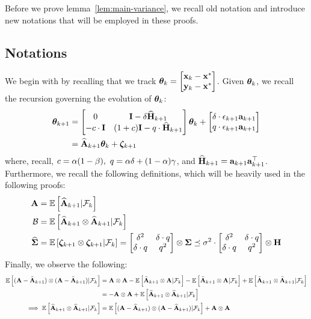 Before we prove lemma~\ref{lem:main-variance}, we recall old notation and introduce new notations that will be employed in these proofs.
\subsection{Notations}
We begin with by recalling that we track $\boldsymbol{\theta}_k=\begin{bmatrix}\mathbf{x}_k-\mathbf{x}^*\\\mathbf{y}_k-\mathbf{x}^*\end{bmatrix}$. Given $\boldsymbol{\theta}_k$, we recall the recursion governing the evolution of $\boldsymbol{\theta}_k$:
\begin{align}
\label{eq:simpleXYRec}
\boldsymbol{\theta}_{k+1}&=\begin{bmatrix}0&\mathbf{I}-\delta\widehat{\mathbf{H}}_{k+1}\\-c\cdot\mathbf{I}&(1+c)\mathbf{I}-q\cdot\widehat{\mathbf{H}}_{k+1}\end{bmatrix}\boldsymbol{\theta}_k+\begin{bmatrix}\delta\cdot\epsilon_{k+1}\mathbf{a}_{k+1}\\q\cdot\epsilon_{k+1}\mathbf{a}_{k+1}\end{bmatrix}\nonumber\\
&=\widehat{\mathbf{A}}_{k+1}\boldsymbol{\theta}_{k}+\boldsymbol{\zeta}_{k+1}
\end{align}
where, recall, $c=\alpha(1-\beta),\  q=\alpha\delta+(1-\alpha)\gamma$, and $\widehat{\mathbf{H}}_{k+1}=\mathbf{a}_{k+1}\mathbf{a}_{k+1}^{\top}$. Furthermore, we recall the following definitions, which will be heavily used in the following proofs:
\begin{align*}
\mathbf{A}&=\mathbb{E}\left[\widehat{\mathbf{A}}_{k+1}|\mathcal{F}_{k}\right]\\
\mathcal{B}&=\mathbb{E}\left[\widehat{\mathbf{A}}_{k+1}\otimes\widehat{\mathbf{A}}_{k+1}|\mathcal{F}_{k}\right]\\
\mathbf{\widehat{\Sigma}}&=\mathbb{E}\left[\boldsymbol{\zeta}_{k+1}\otimes\boldsymbol{\zeta}_{k+1}|\mathcal{F}_{k}\right]=\begin{bmatrix}\delta^2&\delta\cdot q\\\delta\cdot q&q^2\end{bmatrix}\otimes\mathbf{\Sigma}\preceq\sigma^2\cdot\begin{bmatrix}\delta^2&\delta\cdot q\\\delta\cdot q&q^2\end{bmatrix}\otimes\mathbf{H}
\end{align*}
\iffalse
Finally, we observe the following:
\begin{align*}
\mathbb{E}\left[(\mathbf{A}-\widehat{\mathbf{A}}_{k+1})\otimes(\mathbf{A}-\widehat{\mathbf{A}}_{k+1})|\mathcal{F}_k\right]&=\mathbf{A}\otimes\mathbf{A}-\mathbb{E}\left[\widehat{\mathbf{A}}_{k+1}\otimes\mathbf{A}|\mathcal{F}_k\right]-\mathbb{E}\left[\widehat{\mathbf{A}}_{k+1}\otimes\mathbf{A}|\mathcal{F}_k\right]+\mathbb{E}\left[\widehat{\mathbf{A}}_{k+1}\otimes\widehat{\mathbf{A}}_{k+1}|\mathcal{F}_k\right]\\
&=-\mathbf{A}\otimes\mathbf{A}+\mathbb{E}\left[\widehat{\mathbf{A}}_{k+1}\otimes\widehat{\mathbf{A}}_{k+1}|\mathcal{F}_k\right]\\
\implies \mathbb{E}\left[\widehat{\mathbf{A}}_{k+1}\otimes\widehat{\mathbf{A}}_{k+1}|\mathcal{F}_k\right]&=\mathbb{E}\left[(\mathbf{A}-\widehat{\mathbf{A}}_{k+1})\otimes(\mathbf{A}-\widehat{\mathbf{A}}_{k+1})|\mathcal{F}_k\right]+\mathbf{A}\otimes\mathbf{A}
\end{align*}
